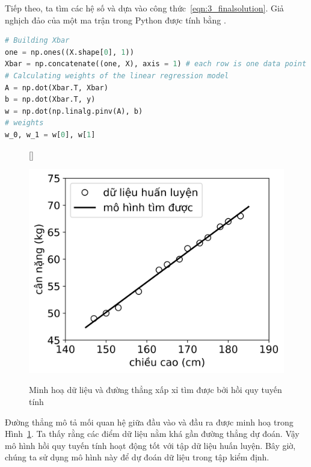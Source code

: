 Tiếp theo, ta tìm các hệ số  và
 dựa vào công thức~\eqref{eqn:3_finalsolution}. Giả
nghịch đảo của một ma trận  trong Python được tính bằng
.%




\begin{lstlisting}[language=Python]
# Building Xbar 
one = np.ones((X.shape[0], 1))
Xbar = np.concatenate((one, X), axis = 1) # each row is one data point 
# Calculating weights of the linear regression model
A = np.dot(Xbar.T, Xbar)
b = np.dot(Xbar.T, y)
w = np.dot(np.linalg.pinv(A), b)
# weights
w_0, w_1 = w[0], w[1]
\end{lstlisting}




\begin{figure}[t]
    [\FBwidth]
    {\caption{
    Minh hoạ dữ liệu và đường thẳng xấp xỉ tìm được bởi hồi quy tuyến tính
    }
    \label{fig:3_2}}
    { %
    \includegraphics[width=.5\textwidth]{Chapters/03_SimpleML/3_linearregression/lr_ex.png}
    }
\end{figure}
Đường thẳng mô tả mối quan hệ giữa đầu vào và đầu ra được minh hoạ trong
Hình~\ref{fig:3_2}. Ta thấy rằng các điểm dữ liệu nằm khá gần đường thẳng dự
đoán. Vậy mô hình hồi quy tuyến tính hoạt động tốt với tập dữ liệu huấn luyện.
Bây giờ, chúng ta sử dụng mô hình này để dự đoán dữ liệu trong tập kiểm định.

